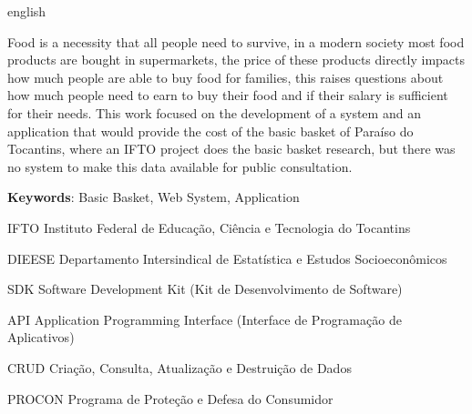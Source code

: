 \documentclass{ifto-tex}
\begin{document}
\begin{resumo}[Abstract]
	\begin{otherlanguage*}{english}
	
	Food is a necessity that all people need to survive, in a modern society most food products are bought in supermarkets, the price of these products directly impacts how much people are able to buy food for families, this raises questions about how much people need to earn to buy their food and if their salary is sufficient for their needs. This work focused on the development of a system and an application that would provide the cost of the basic basket of Paraíso do Tocantins, where an IFTO project does the basic basket research, but there was no system to make this data available for public consultation.
		
		\noindent 
		\textbf{Keywords}: Basic Basket, Web System, Application
	\end{otherlanguage*}
\end{resumo}


\listoffigures*
\cleardoublepage


\listoftables*
\cleardoublepage

\begin{siglas}
	\item[IFTO]{Instituto Federal de Educação, Ciência e Tecnologia do Tocantins}
	\item[DIEESE]{Departamento Intersindical de Estatística e Estudos Socioeconômicos}
	\item[SDK]{Software Development Kit (Kit de Desenvolvimento de Software)}
	\item [API]{Application Programming Interface (Interface de Programação de Aplicativos)}
	\item[CRUD]{Criação, Consulta, Atualização e Destruição de Dados}
	\item[PROCON]{Programa de Proteção e Defesa do Consumidor}
\end{siglas}
\end{document}
